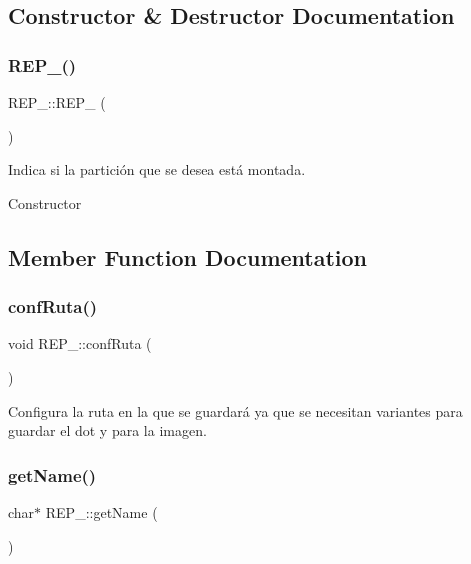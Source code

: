 \subsection{Constructor \& Destructor Documentation}
\mbox{\label{classREP___a067733aa62d5f5cc028fd4de7e2eba3a}} 
\subsubsection{\texorpdfstring{R\+E\+P\+\_\+()}{REP\_()}}
{\footnotesize\ttfamily R\+E\+P\+\_\+\+::\+R\+E\+P\+\_\+ (\begin{DoxyParamCaption}{ }\end{DoxyParamCaption})\hspace{0.3cm}{\ttfamily [inline]}}



Indica si la partición que se desea está montada. 

Constructor 

\subsection{Member Function Documentation}
\mbox{\label{classREP___ac10352477beb170b15096cf13c559935}} 
\subsubsection{\texorpdfstring{conf\+Ruta()}{confRuta()}}
{\footnotesize\ttfamily void R\+E\+P\+\_\+\+::conf\+Ruta (\begin{DoxyParamCaption}{ }\end{DoxyParamCaption})}

Configura la ruta en la que se guardará ya que se necesitan variantes para guardar el dot y para la imagen. \mbox{\label{classREP___a9d4e00566ad8a08662f06e97265e059d}} 
\subsubsection{\texorpdfstring{get\+Name()}{getName()}}
{\footnotesize\ttfamily char$\ast$ R\+E\+P\+\_\+\+::get\+Name (\begin{DoxyParamCaption}{ }\end{DoxyParamCaption})\hspace{0.3cm}{\ttfamily [inline]}}

